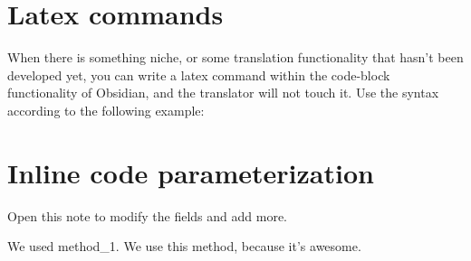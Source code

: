 \documentclass{extarticle}
\begin{document}




\section{Latex commands}

When there is something niche, or some translation functionality that hasn't been developed yet, you can write a latex command within the code-block functionality of Obsidian, and the translator will not touch it. Use the syntax according to the following example:





\lipsum[1-4]





\section{Inline code parameterization}

Open this note to modify the fields and add more.

We used method_1. We use this method, because it's awesome. 





\appendix




\newpage 
\newpage 







\end{document}
